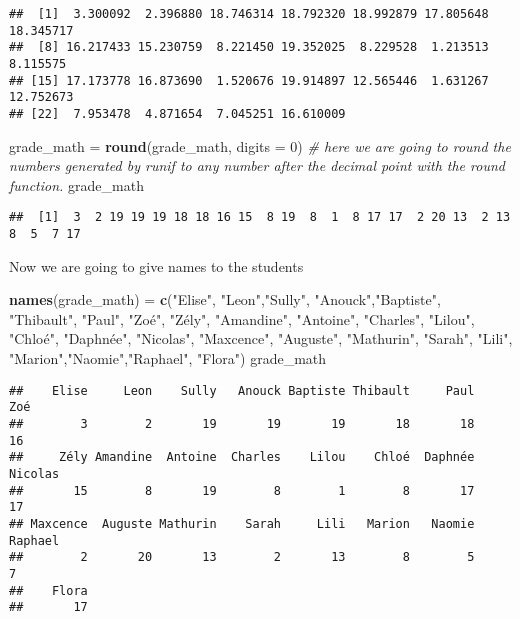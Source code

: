 \documentclass[
]{article}
\newenvironment{Shaded}{\begin{snugshade}}{\end{snugshade}}
\newcommand{\AttributeTok}[1]{\textcolor[rgb]{0.13,0.29,0.53}{#1}}
\newcommand{\CommentTok}[1]{\textcolor[rgb]{0.56,0.35,0.01}{\textit{#1}}}
\newcommand{\DecValTok}[1]{\textcolor[rgb]{0.00,0.00,0.81}{#1}}
\newcommand{\FunctionTok}[1]{\textcolor[rgb]{0.13,0.29,0.53}{\textbf{#1}}}
\newcommand{\NormalTok}[1]{#1}
\newcommand{\OtherTok}[1]{\textcolor[rgb]{0.56,0.35,0.01}{#1}}
\newcommand{\StringTok}[1]{\textcolor[rgb]{0.31,0.60,0.02}{#1}}
\begin{document}
\begin{verbatim}
##  [1]  3.300092  2.396880 18.746314 18.792320 18.992879 17.805648 18.345717
##  [8] 16.217433 15.230759  8.221450 19.352025  8.229528  1.213513  8.115575
## [15] 17.173778 16.873690  1.520676 19.914897 12.565446  1.631267 12.752673
## [22]  7.953478  4.871654  7.045251 16.610009
\end{verbatim}

\begin{Shaded}
\begin{Highlighting}[]
\NormalTok{grade\_math }\OtherTok{=} \FunctionTok{round}\NormalTok{(grade\_math, }\AttributeTok{digits =} \DecValTok{0}\NormalTok{) }\CommentTok{\# here we are going to round the numbers generated by runif to any number after the decimal point with the round function.}
\NormalTok{grade\_math}
\end{Highlighting}
\end{Shaded}

\begin{verbatim}
##  [1]  3  2 19 19 19 18 18 16 15  8 19  8  1  8 17 17  2 20 13  2 13  8  5  7 17
\end{verbatim}

Now we are going to give names to the students

\begin{Shaded}
\begin{Highlighting}[]
\FunctionTok{names}\NormalTok{(grade\_math) }\OtherTok{=} \FunctionTok{c}\NormalTok{(}\StringTok{"Elise"}\NormalTok{, }\StringTok{"Leon"}\NormalTok{,}\StringTok{"Sully"}\NormalTok{, }\StringTok{"Anouck"}\NormalTok{,}\StringTok{"Baptiste"}\NormalTok{, }\StringTok{"Thibault"}\NormalTok{, }\StringTok{"Paul"}\NormalTok{, }\StringTok{"Zoé"}\NormalTok{, }\StringTok{"Zély"}\NormalTok{, }\StringTok{"Amandine"}\NormalTok{, }\StringTok{"Antoine"}\NormalTok{, }\StringTok{"Charles"}\NormalTok{, }\StringTok{"Lilou"}\NormalTok{, }\StringTok{"Chloé"}\NormalTok{, }\StringTok{"Daphnée"}\NormalTok{, }\StringTok{"Nicolas"}\NormalTok{, }\StringTok{"Maxcence"}\NormalTok{, }\StringTok{"Auguste"}\NormalTok{, }\StringTok{"Mathurin"}\NormalTok{, }\StringTok{"Sarah"}\NormalTok{, }\StringTok{"Lili"}\NormalTok{, }\StringTok{"Marion"}\NormalTok{,}\StringTok{"Naomie"}\NormalTok{,}\StringTok{"Raphael"}\NormalTok{, }\StringTok{"Flora"}\NormalTok{)}
\NormalTok{grade\_math}
\end{Highlighting}
\end{Shaded}

\begin{verbatim}
##    Elise     Leon    Sully   Anouck Baptiste Thibault     Paul      Zoé 
##        3        2       19       19       19       18       18       16 
##     Zély Amandine  Antoine  Charles    Lilou    Chloé  Daphnée  Nicolas 
##       15        8       19        8        1        8       17       17 
## Maxcence  Auguste Mathurin    Sarah     Lili   Marion   Naomie  Raphael 
##        2       20       13        2       13        8        5        7 
##    Flora 
##       17
\end{verbatim}
\end{document}
